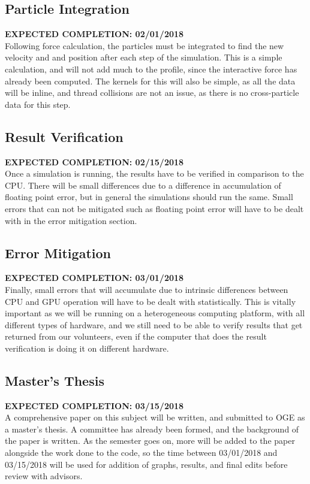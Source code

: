 \documentclass[fleqn,10pt]{SelfArx} %
\begin{document}
\subsection{Particle Integration}
\textbf{EXPECTED COMPLETION: 02/01/2018}\\
Following force calculation, the particles must be integrated to find the new velocity and and position after each step of the simulation. This is a simple calculation, and will not add much to the profile, since the interactive force has already been computed. The kernels for this will also be simple, as all the data will be inline, and thread collisions are not an issue, as there is no cross-particle data for this step.

\subsection{Result Verification}
\textbf{EXPECTED COMPLETION: 02/15/2018}\\
Once a simulation is running, the results have to be verified in comparison to the CPU. There will be small differences due to a difference in accumulation of floating point error, but in general the simulations should run the same. Small errors that can not be mitigated such as floating point error will have to be dealt with in the error mitigation section.

\subsection{Error Mitigation}
\textbf{EXPECTED COMPLETION: 03/01/2018}\\
Finally, small errors that will accumulate due to intrinsic differences between CPU and GPU operation will have to be dealt with statistically. This is vitally important as we will be running on a heterogeneous computing platform, with all different types of hardware, and we still need to be able to verify results that get returned from our volunteers, even if the computer that does the result verification is doing it on different hardware.

\subsection{Master's Thesis}
\textbf{EXPECTED COMPLETION: 03/15/2018}\\
A comprehensive paper on this subject will be written, and submitted to OGE as a master's thesis. A committee has already been formed, and the background of the paper is written. As the semester goes on, more will be added to the paper alongside the work done to the code, so the time between 03/01/2018 and 03/15/2018 will be used for addition of graphs, results, and final edits before review with advisors.
\end{document}
